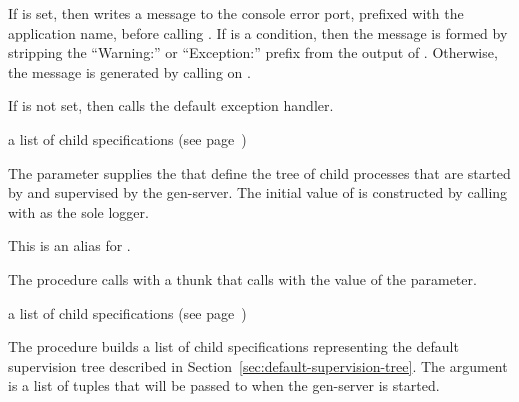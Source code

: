 If  is set, then  writes a
message to the console error port, prefixed with the application name,
before calling .
If  is a condition, then the message is formed by stripping the
``Warning:'' or ``Exception:'' prefix from the output of .
Otherwise, the message is generated by calling
on .

If  is not set, then 
calls the default exception handler.

\begin{parameter}
\end{parameter}
\hasvalue{} a list of child specifications (see page~\pageref{page:child-spec})

The  parameter supplies the 
that define the tree of child processes that are started by
 and supervised by the  gen-server.
The initial value of  is constructed by calling
 with  as the
sole logger.

\begin{syntax}
\end{syntax}

This is an alias for .

\begin{procedure}
\end{procedure}
\returns{} 

The  procedure calls 
with a  thunk that calls 
with the value of the  parameter.

\begin{procedure}
\end{procedure}
\returns{} a list of child specifications (see page~\pageref{page:child-spec})

The  procedure builds a list of child specifications
representing the default supervision tree described in
Section~\ref{sec:default-supervision-tree}.
The  argument is a list of  tuples that will
be passed to  when the  gen-server is started.

